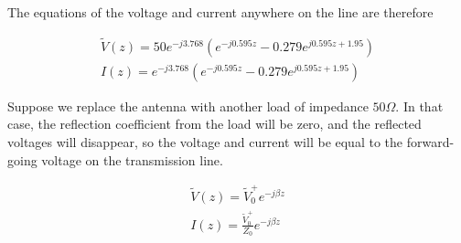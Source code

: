 \documentclass{ximera}
\begin{document}
\begin{example}
\begin{explanation}
The equations of the voltage and current anywhere on the line are therefore

\begin{eqnarray}
\tilde{V}(z)= 50  e^{-j3.768} (e^{-j 0.595 z} - 0.279  e^{j 0.595 z + 1.95}  ) \\
I(z)=   e^{-j3.768}   (e^{-j 0.595 z} - 0.279  e^{j 0.595 z+ 1.95}  ) 
\end{eqnarray}

Suppose we replace the antenna with another load of impedance $50\Omega$. In that case, the reflection coefficient from the load will be zero, and the reflected voltages will disappear, so the voltage and current will be equal to the forward-going voltage on the transmission line. 


\begin{eqnarray}
\tilde{V}(z)= \tilde{V}_0^+ e^{-j \beta z}   \\
I(z)=   \frac{\tilde{V}_0^+}{Z_0}  e^{-j \beta z} 
\end{eqnarray}


\end{explanation}




\end{example}
\end{document}
